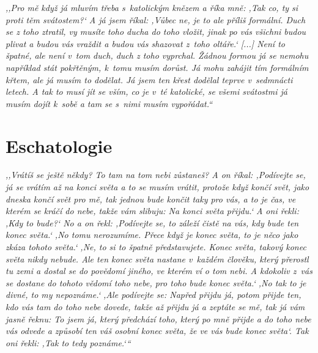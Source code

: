\textit{%
,,Pro mě když já mluvím třeba s~katolickým knězem a říka mně: ,Tak co, ty si
proti těm svátostem?{}` A já jsem říkal: ,Vůbec ne, je to ale příliš formální.
Duch se z toho ztratil, vy musíte toho ducha do toho vložit, jinak po vás
všichni budou plivat a budou vás vraždit a budou vás shazovat z~toho oltáře.`
[...] %
Není to špatné, ale není v~tom duch, duch z toho vyprchal. Žádnou formou já se
nemohu například stát pokřtěným, k~tomu musím dorůst. Já mohu zahájit tím
formálním křtem, ale já musím to dodělat. Já jsem ten křest dodělal teprve
v~sedmnácti letech. A tak to musí jít se vším, co je v~té katolické, se všemi
svátostmi já musím dojít k~sobě a tam se s~nimi musím vypořádat.``
}

\section{Eschatologie}

\textit{%
,,Vrátíš se ještě někdy? To tam na tom nebi zůstaneš? A on říkal: ,Podívejte se,
já se vrátím až na konci světa a to se musím vrátit, protože když končí svět,
jako dneska končí svět pro mě, tak jednou bude končit taky pro vás, a to je čas,
ve kterém se kráčí do nebe, takže vám slibuju: Na konci světa přijdu.` A oni
řekli: ,Kdy to bude?{}` No a on řekl: ,Podívejte se, to záleží čistě na vás, kdy
bude ten konec světa.` ,No tomu nerozumíme. Přece když je konec světa, to je
něco jako zkáza tohoto světa.` ,Ne, to si to špatně představujete. Konec světa,
takový konec světa nikdy nebude. Ale ten konec světa nastane v~každém člověku,
který přerostl tu zemi a dostal se do povědomí jiného, ve kterém ví o tom nebi.
A kdokoliv z~vás se dostane do tohoto vědomí toho nebe, pro toho bude konec
světa.` ,No tak to je divné, to my nepoznáme.` ,Ale podívejte se: Napřed přijdu
já, potom přijde ten, kdo vás tam do toho nebe dovede, takže až přijdu já a
zeptáte se mě, tak já vám jasně řeknu: \guillemotright{}To jsem já, který
předchází toho, který po mně přijde a do toho nebe vás odvede a způsobí ten váš
osobní konec světa, že ve vás bude konec světa\guillemotleft{}`. Tak oni řekli:
,Tak to tedy poznáme.`{}``
}

